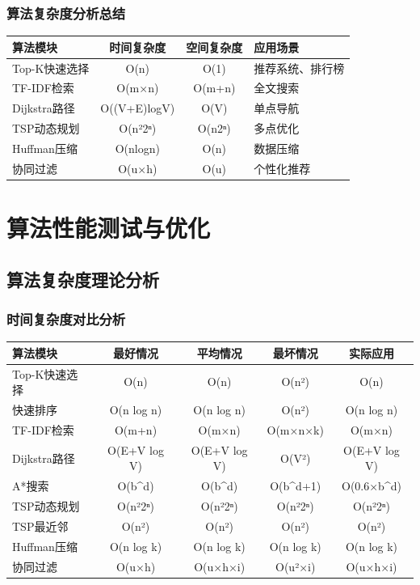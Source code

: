 \documentclass[12pt,a4paper]{article}
\begin{document}
\subsubsection{算法复杂度分析总结}
\begin{center}
\begin{tabular}{|l|c|c|l|}
\hline
\textbf{算法模块} & \textbf{时间复杂度} & \textbf{空间复杂度} & \textbf{应用场景} \\
\hline
Top-K快速选择 & O(n) & O(1) & 推荐系统、排行榜 \\
TF-IDF检索 & O(m×n) & O(m+n) & 全文搜索 \\
Dijkstra路径 & O((V+E)logV) & O(V) & 单点导航 \\
TSP动态规划 & O(n²2ⁿ) & O(n2ⁿ) & 多点优化 \\
Huffman压缩 & O(nlogn) & O(n) & 数据压缩 \\
协同过滤 & O(u×h) & O(u) & 个性化推荐 \\
\hline
\end{tabular}
\end{center}




\section{算法性能测试与优化}

\subsection{算法复杂度理论分析}
\subsubsection{时间复杂度对比分析}
\begin{center}
\begin{tabular}{|l|c|c|c|c|}
\hline
\textbf{算法模块} & \textbf{最好情况} & \textbf{平均情况} & \textbf{最坏情况} & \textbf{实际应用} \\
\hline
Top-K快速选择 & O(n) & O(n) & O(n²) & O(n) \\
快速排序 & O(n log n) & O(n log n) & O(n²) & O(n log n) \\
TF-IDF检索 & O(m+n) & O(m×n) & O(m×n×k) & O(m×n) \\
Dijkstra路径 & O(E+V log V) & O(E+V log V) & O(V²) & O(E+V log V) \\
A*搜索 & O(b^d) & O(b^d) & O(b^{d+1}) & O(0.6×b^d) \\
TSP动态规划 & O(n²2ⁿ) & O(n²2ⁿ) & O(n²2ⁿ) & O(n²2ⁿ) \\
TSP最近邻 & O(n²) & O(n²) & O(n²) & O(n²) \\
Huffman压缩 & O(n log k) & O(n log k) & O(n log k) & O(n log k) \\
协同过滤 & O(u×h) & O(u×h×i) & O(u²×i) & O(u×h×i) \\
\hline
\end{tabular}
\end{center}
\end{document}
